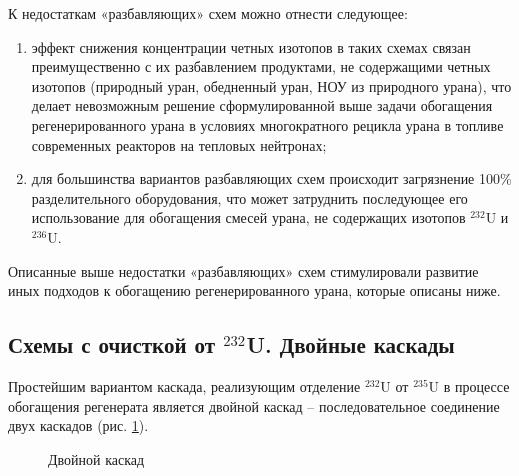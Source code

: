 К недостаткам «разбавляющих» схем можно отнести следующее:

\begin{enumerate}
  \item	эффект снижения концентрации четных изотопов в таких схемах связан преимущественно с их разбавлением продуктами, не содержащими четных изотопов (природный уран, обедненный уран, НОУ из природного урана), что делает невозможным решение сформулированной выше задачи обогащения регенерированного урана в условиях многократного рецикла урана в топливе современных реакторов на тепловых нейтронах;
  \item	 для большинства вариантов разбавляющих схем происходит загрязнение 100\% разделительного оборудования, что может затруднить последующее его использование для обогащения смесей урана, не содержащих изотопов $^{232}$U и $^{236}$U.
\end{enumerate}

Описанные выше недостатки «разбавляющих» схем стимулировали развитие иных подходов к обогащению регенерированного урана, которые описаны ниже.


\subsection{Схемы с очисткой от $^{232}$U. Двойные каскады}\label{ch1/dvoynoy}

Простейшим вариантом каскада, реализующим отделение $^{232}$U от $^{235}$U в процессе обогащения регенерата является двойной каскад -- последовательное соединение двух каскадов (рис. \ref{fig:double_ru}). 

\begin{figure}[ht]
  \caption{Двойной каскад}\label{fig:double_ru}
\end{figure}

